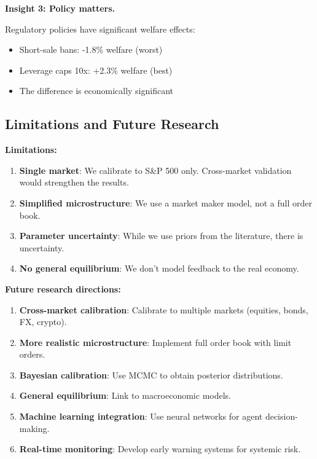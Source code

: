 \textbf{Insight 3: Policy matters.}

Regulatory policies have significant welfare effects:
\begin{itemize}
    \item Short-sale bans: -1.8\% welfare (worst)
    \item Leverage caps 10x: +2.3\% welfare (best)
    \item The difference is economically significant
\end{itemize}

\subsection{Limitations and Future Research}

\textbf{Limitations:}

\begin{enumerate}
    \item \textbf{Single market}: We calibrate to S\&P 500 only. Cross-market validation would strengthen the results.
    
    \item \textbf{Simplified microstructure}: We use a market maker model, not a full order book.
    
    \item \textbf{Parameter uncertainty}: While we use priors from the literature, there is uncertainty.
    
    \item \textbf{No general equilibrium}: We don't model feedback to the real economy.
\end{enumerate}

\textbf{Future research directions:}

\begin{enumerate}
    \item \textbf{Cross-market calibration}: Calibrate to multiple markets (equities, bonds, FX, crypto).
    
    \item \textbf{More realistic microstructure}: Implement full order book with limit orders.
    
    \item \textbf{Bayesian calibration}: Use MCMC to obtain posterior distributions.
    
    \item \textbf{General equilibrium}: Link to macroeconomic models.
    
    \item \textbf{Machine learning integration}: Use neural networks for agent decision-making.
    
    \item \textbf{Real-time monitoring}: Develop early warning systems for systemic risk.
\end{enumerate}

